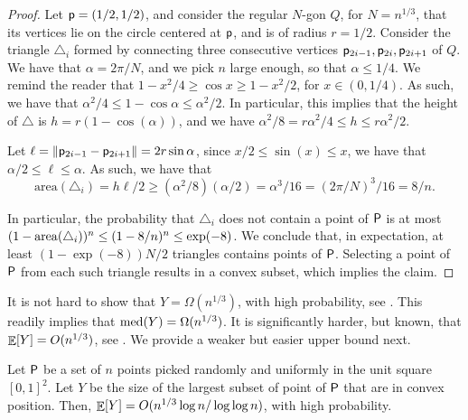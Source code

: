 \begin{proof}
    Let $\mathsf{p} = (1/2,1/2)$, and consider the regular $N$-gon $Q$, for
    $N = n^{1/3}$, that its vertices lie on the circle centered at
    $\mathsf{p}$, and is of radius $r=1/2$. Consider the triangle
    $\triangle_i$ formed by connecting three consecutive vertices
    $\mathsf{p}_{2i-1}, \mathsf{p}_{2i}, \mathsf{p}_{2i+1}$ of $Q$. We have that
    $\alpha = 2\pi / N$, and we pick $n$ large enough, so that
    $\alpha \leq 1/4$. We remind the reader that
    $1-x^2/4 \geq \cos x \geq 1-x^2/2$, for $x \in (0,1/4)$. As such,
    we have that $\alpha^2/4 \leq 1-\cos \alpha \leq \alpha^2/2$. In
    particular, this implies that the height of $\triangle$ is
    $h = r(1-\cos(\alpha))$, and we have
    $\alpha^2/8 = r\alpha^2/4 \leq h \leq r \alpha^2/2$.

    Let $\ell = \left\| {\mathsf{p}_{2i-1} - \mathsf{p}_{2i+1}} \right\| = 2 r \sin \alpha$,
    since $x/2 \leq \sin(x) \leq x$, we have that
    $\alpha/2 \leq \ell \leq \alpha$. As such, we have that
    \begin{equation*}
        \mathrm{area}(\triangle_i) = h \ell /2%
        \geq%
        (\alpha^2/8) (\alpha/2)%
        =%
        \alpha^3/16
        =%
        (2\pi / N)^3 /16%
        =%
        8 /n.
    \end{equation*}

    In particular, the probability that $\triangle_i$ does not contain
    a point of ${\mathsf{P}}$ is at most
    $(1-\areaX{\triangle_i})^n \leq (1-8/n)^n \leq \exp(-8)$.  We
    conclude that, in expectation, at least $(1-\exp(-8))N/2$
    triangles contains points of ${\mathsf{P}}$. Selecting a point of
    ${\mathsf{P}}$ from each such triangle results in a convex subset,
    which implies the claim.
\end{proof}

It is not hard to show that $Y = \Omega(n^{1/3})$, with high
probability, see . This readily implies that
$\medX{Y} = \Omega(n^{1/3})$. It is significantly harder, but known,
that $\mathop{\mathbb{E}}\!\left[ {Y} \right] =O(n^{1/3})$, see \cite{v-pnrpc-94}. We provide a weaker
but easier upper bound next.




\begin{lemma}
    Let ${\mathsf{P}}$ be a set of $n$ points picked randomly and uniformly
    in the unit square $[0,1]^2$. Let $Y$ be the size of the largest
    subset of point of ${\mathsf{P}}$ that are in convex position. Then,
    $\mathop{\mathbb{E}}\!\left[ {Y} \right] = O(n^{1/3} \log n / \log \log n)$, with high probability.
\end{lemma}

